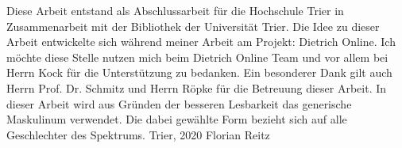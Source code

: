 \preface

Diese Arbeit entstand als Abschlussarbeit für die Hochschule Trier in Zusammenarbeit mit der Bibliothek der Universität Trier. 
\newline
\newline
Die Idee zu dieser Arbeit entwickelte sich während meiner Arbeit am Projekt: Dietrich Online. Ich möchte diese Stelle nutzen mich beim Dietrich Online Team und vor allem bei Herrn Kock für die Unterstützung zu bedanken.
\newline
\newline
Ein besonderer Dank gilt auch Herrn Prof. Dr. Schmitz und Herrn Röpke für die Betreuung dieser Arbeit.
\newline
\newline
In dieser Arbeit wird aus Gründen der besseren Lesbarkeit das generische Maskulinum verwendet. Die dabei gewählte Form bezieht sich auf alle Geschlechter des Spektrums.
\newline
Trier, 2020
\newline
\noindent Florian Reitz